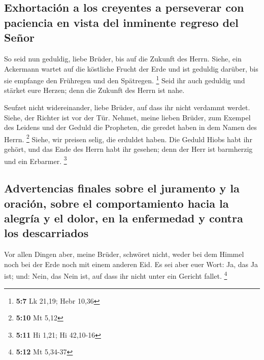 \hypertarget{exhortaciuxf3n-a-los-creyentes-a-perseverar-con-paciencia-en-vista-del-inminente-regreso-del-seuxf1or}{%
\subsection{Exhortación a los creyentes a perseverar con paciencia en
vista del inminente regreso del
Señor}\label{exhortaciuxf3n-a-los-creyentes-a-perseverar-con-paciencia-en-vista-del-inminente-regreso-del-seuxf1or}}

 So seid nun geduldig, liebe Brüder, bis auf die Zukunft
des Herrn. Siehe, ein Ackermann wartet auf die köstliche Frucht der Erde
und ist geduldig darüber, bis sie empfange den Frühregen und den
Spätregen. \footnote{\textbf{5:7} Lk 21,19; Hebr 10,36} 
Seid ihr auch geduldig und stärket eure Herzen; denn die Zukunft des
Herrn ist nahe.

 Seufzet nicht widereinander, liebe Brüder, auf dass ihr
nicht verdammt werdet. Siehe, der Richter ist vor der Tür.
 Nehmet, meine lieben Brüder, zum Exempel des Leidens und
der Geduld die Propheten, die geredet haben in dem Namen des Herrn.
\footnote{\textbf{5:10} Mt 5,12}  Siehe, wir preisen
selig, die erduldet haben. Die Geduld Hiobs habt ihr gehört, und das
Ende des Herrn habt ihr gesehen; denn der Herr ist barmherzig und ein
Erbarmer. \footnote{\textbf{5:11} Hi 1,21; Hi 42,10-16}

\hypertarget{advertencias-finales-sobre-el-juramento-y-la-oraciuxf3n-sobre-el-comportamiento-hacia-la-alegruxeda-y-el-dolor-en-la-enfermedad-y-contra-los-descarriados}{%
\subsection{Advertencias finales sobre el juramento y la oración, sobre
el comportamiento hacia la alegría y el dolor, en la enfermedad y contra
los
descarriados}\label{advertencias-finales-sobre-el-juramento-y-la-oraciuxf3n-sobre-el-comportamiento-hacia-la-alegruxeda-y-el-dolor-en-la-enfermedad-y-contra-los-descarriados}}

 Vor allen Dingen aber, meine Brüder, schwöret nicht,
weder bei dem Himmel noch bei der Erde noch mit einem anderen Eid. Es
sei aber euer Wort: Ja, das Ja ist; und: Nein, das Nein ist, auf dass
ihr nicht unter ein Gericht fallet. \footnote{\textbf{5:12} Mt 5,34-37}

